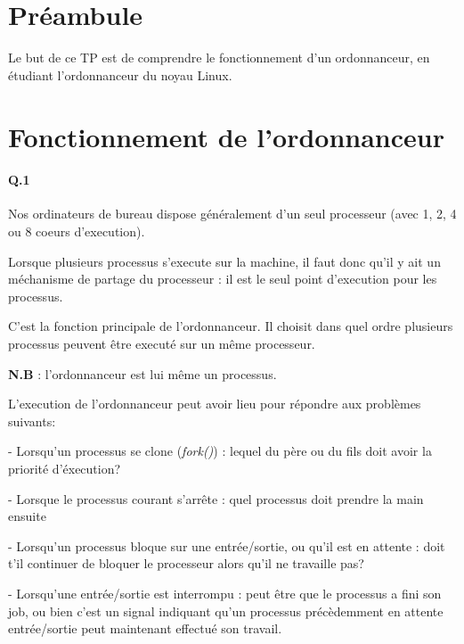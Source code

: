 \documentclass[10pt]{article}
\begin{document}
    \maketitle
    \tableofcontents
    \section{Préambule}
    
    Le but de ce TP est de comprendre le fonctionnement d'un ordonnanceur, en étudiant l'ordonnanceur du noyau Linux.

    \newpage
    \section{Fonctionnement de l'ordonnanceur}
        \paragraph{Q.1}
        Nos ordinateurs de bureau dispose généralement d'un seul processeur (avec 1, 2, 4 ou 8 coeurs d'execution).
        
        Lorsque plusieurs processus s'execute sur la machine, il faut donc qu'il
        y ait un méchanisme de partage du processeur : il est le seul point d'execution pour les processus.
    
        C'est la fonction principale de l'ordonnanceur.
        Il choisit dans quel ordre plusieurs processus peuvent être executé sur un même processeur.
        
        \textbf{N.B} : l'ordonnanceur est lui même un processus.
                
        L'execution de l'ordonnanceur peut avoir lieu pour répondre aux problèmes suivants:
        
        - Lorsqu'un processus se clone (\textit{fork()}) : lequel du père ou du fils doit avoir la priorité d'éxecution?
        
        - Lorsque le processus courant s'arrête : quel processus doit prendre la main ensuite
        
        - Lorsqu'un processus bloque sur une entrée/sortie, ou qu'il est en attente : doit t'il continuer de bloquer le processeur alors qu'il ne travaille pas?
        
        - Lorsqu'une entrée/sortie est interrompu : peut être que le processus a fini son job, ou bien c'est un signal indiquant qu'un processus précèdemment en attente entrée/sortie peut maintenant effectué son travail.
        
\end{document}
